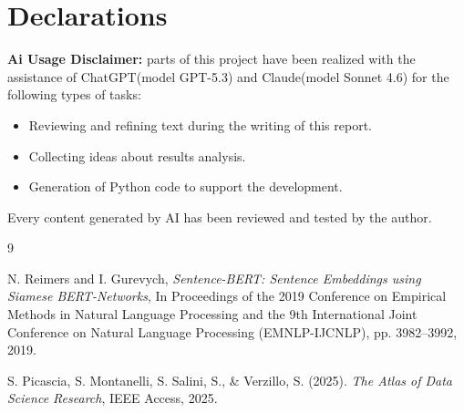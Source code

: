 \documentclass[pdflatex,sn-mathphys-num]{sn-jnl}%
\theoremstyle{thmstyleone}%
\theoremstyle{thmstyletwo}%
\theoremstyle{thmstylethree}%
\begin{document}
\section*{Declarations}
\textbf{Ai Usage Disclaimer:} parts of this project have been realized with the assistance of ChatGPT(model GPT-5.3) and Claude(model Sonnet 4.6) for the following types of tasks:
\begin{itemize}
\item Reviewing and refining text during the writing of this report.
\item Collecting ideas about results analysis.
\item Generation of Python code to support the development.
\end{itemize}

Every content generated by AI has been reviewed and tested by the author.
\begin{thebibliography}{9}

N. Reimers and I. Gurevych,
\textit{Sentence-BERT: Sentence Embeddings using Siamese BERT-Networks},
In Proceedings of the 2019 Conference on Empirical Methods in Natural Language Processing and the 9th International Joint Conference on Natural Language Processing (EMNLP-IJCNLP), pp. 3982--3992, 2019.

S. Picascia, S. Montanelli, S. Salini, S., \& Verzillo, S. (2025).
\textit{The Atlas of Data Science Research},
IEEE Access, 2025.

\end{thebibliography}
\end{document}

